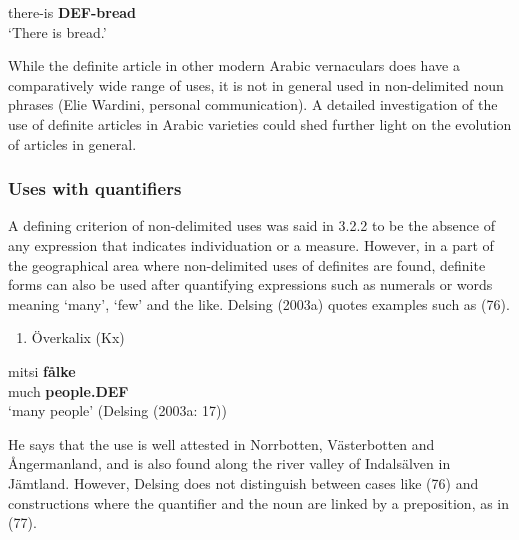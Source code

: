 there-is  \textbf{DEF-bread}\\ %


‘There is bread.’
\z


While the definite article in other modern Arabic vernaculars does have a comparatively wide range of uses, it is not in general used in non-delimited noun phrases (Elie Wardini, personal communication). A detailed investigation of the use of definite articles in Arabic varieties could shed further light on the evolution of articles in general.

\subsubsection[Uses with quantifiers]{\rmfamily Uses with quantifiers}
\label{bkm:Ref114303795}%
A defining criterion of non-delimited uses was said in 3.2.2 to be the absence of any expression that indicates individuation or a measure. However, in a part of the geographical area where non-delimited uses of definites are found, definite forms can also be used after quantifying expressions such as numerals or words meaning ‘many’, ‘few’ and the like. Delsing (2003a) quotes examples such as (76).

\begin{enumerate} %
\item 
\label{bkm:Ref64458018}\label{bkm:Ref159664857}Överkalix (Kx) 

\end{enumerate} %
\ea\label{}
\gll mitsi  \textbf{fålke}\\


much  \textbf{people.DEF}\\ %


‘many people’ (Delsing (2003a: 17))
\z

He says that the use is well attested in Norrbotten, Västerbotten and Ångermanland, and is also found along the river valley of Indalsälven in Jämtland. However, Delsing does not distinguish between cases like (76) and constructions where the quantifier and the noun are linked by a preposition, as in (77).

